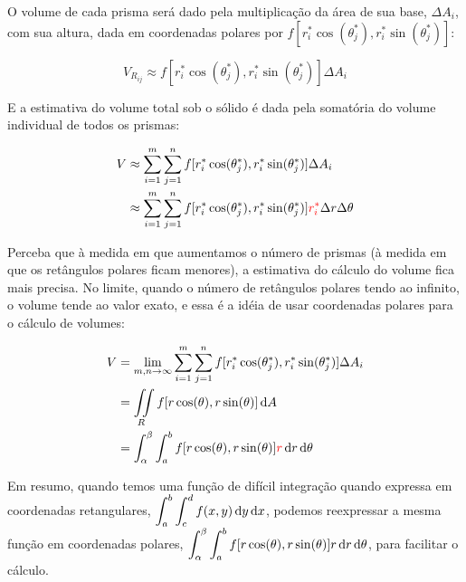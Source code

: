 O volume de cada prisma será dado pela multiplicação da área de sua base,
$\Delta A_i$, com sua altura, dada em coordenadas polares por $f[r_i^*
  \cos(\theta_j^*), r_i^* \sin(\theta_j^*)]$:

\begin{equation}
      V_{R_{ij}} \approx f[r_i^* \cos(\theta_j^*), r_i^* \sin(\theta_j^*)] \Delta A_i
\end{equation}

E a estimativa do volume total sob o sólido é dada pela somatória do
volume individual de todos os prismas:

\begin{equation}
  \begin{split}
    V &\approx \sum_{i=1}^m \sum_{j=1}^n f[r_i^* \cos(\theta_j^*),
    r_i^* \sin(\theta_j^*)] \Delta A_i\\
      &\approx \sum_{i=1}^m \sum_{j=1}^n f[r_i^* \cos(\theta_j^*),
    r_i^* \sin(\theta_j^*)] \color{red}r_i^*\color{black}\Delta r
    \Delta \theta
  \end{split}
\end{equation}

Perceba que à medida em que aumentamos o número de prismas (à medida
em que os retângulos polares ficam menores), a estimativa do cálculo
do volume fica mais precisa. No limite, quando o número de retângulos
polares tendo ao infinito, o volume tende ao valor exato, e essa é a
idéia de usar coordenadas polares para o cálculo de volumes:

\begin{equation}
  \begin{split}
    V &= \lim_{m,n \to \infty} \sum_{i=1}^m \sum_{j=1}^n f[r_i^* \cos(\theta_j^*),
      r_i^* \sin(\theta_j^*)] \Delta A_i\\
      &= \iint\displaylimits_R f[r \cos(\theta), r \sin(\theta)]
    \mathop{}\!\mathrm{d} A\\
      &= \int_\alpha^\beta \int_a^b f[r \cos(\theta), r
      \sin(\theta)] \color{red}r\color{black} \mathop{}\!\mathrm{d} r \mathop{}\!\mathrm{d} \theta
  \end{split}
\end{equation}

Em resumo, quando temos uma função de difícil integração quando
expressa em coordenadas retangulares, $\displaystyle \int_a^b \int_c^d f(x, y) \mathop{}\!\mathrm{d}
y \mathop{}\!\mathrm{d} x$,
podemos reexpressar a mesma função em coordenadas polares,
$\displaystyle \int_\alpha^\beta \int_a^b f[r \cos(\theta), r
      \sin(\theta)] r \mathop{}\!\mathrm{d} r \mathop{}\!\mathrm{d} \theta$,
para facilitar o cálculo.
